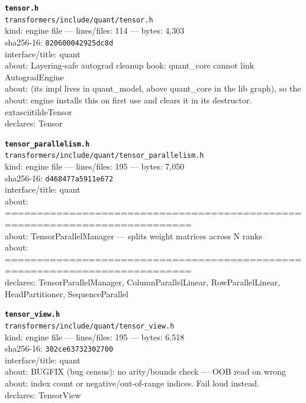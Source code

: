 \noindent\textbf{\texttt{tensor.h}}\\
\texttt{transformers/include/quant/tensor.h}\\
kind: engine file --- lines/files: 114 --- bytes: 4,303\\
sha256-16: \texttt{820600042925dc8d}\\
interface/title: quant\\
about: Layering-safe autograd cleanup hook: quant\_core cannot link AutogradEngine\\
about: (its impl lives in quant\_model, above quant\_core in the lib graph), so the\\
about: engine installs this on first use and clears it in its destructor. 	extasciitilde{}Tensor\\
declares: Tensor\\
\vspace*{6.0pt}
\newpage

\noindent\textbf{\texttt{tensor\_parallelism.h}}\\
\texttt{transformers/include/quant/tensor\_parallelism.h}\\
kind: engine file --- lines/files: 195 --- bytes: 7,050\\
sha256-16: \texttt{d468477a5911e672}\\
interface/title: quant\\
about: ===========================================================================\\
about: TensorParallelManager — splits weight matrices across N ranks\\
about: ===========================================================================\\
declares: TensorParallelManager, ColumnParallelLinear, RowParallelLinear, HeadPartitioner, SequenceParallel\\
\vspace*{6.0pt}

\noindent\textbf{\texttt{tensor\_view.h}}\\
\texttt{transformers/include/quant/tensor\_view.h}\\
kind: engine file --- lines/files: 195 --- bytes: 6,518\\
sha256-16: \texttt{302ce63732302700}\\
interface/title: quant\\
about: BUGFIX (bug census): no arity/bounds check — OOB read on wrong\\
about: index count or negative/out-of-range indices. Fail loud instead.\\
declares: TensorView\\
\vspace*{6.0pt}


